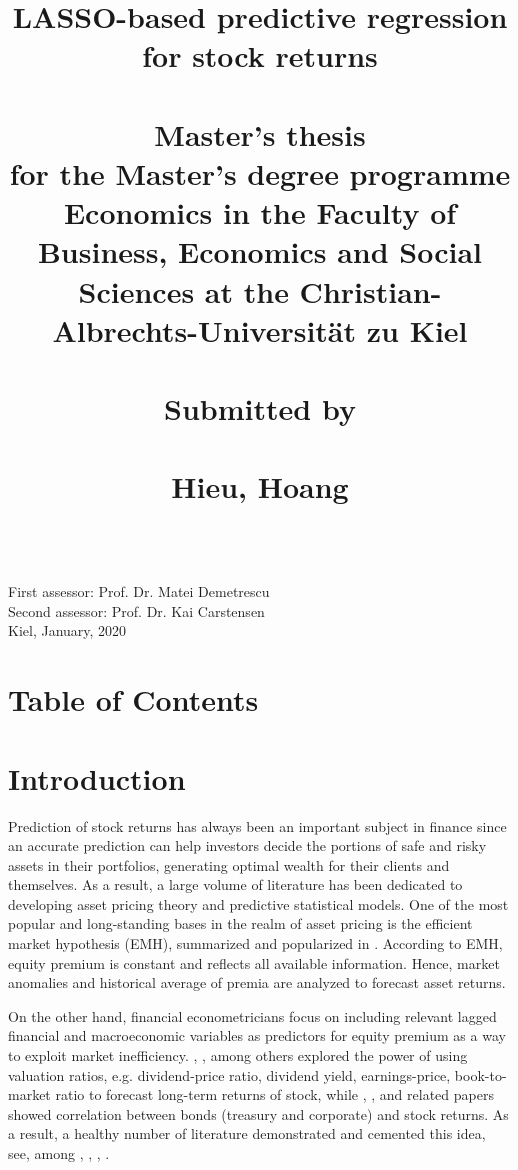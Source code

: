 \documentclass[12pt,a4paper]{article}
\title{LASSO-based predictive regression for stock returns \\~\\
\large Master's thesis \\
\large for the Master's degree programme Economics in the Faculty of Business, Economics and Social Sciences at the Christian-Albrechts-Universität zu Kiel \\~\\
\large Submitted by \\~\\
\large Hieu, Hoang}
\date{}
\begin{document}
\begin{titlepage}
	\maketitle
	\mbox{} \\[1in]
	First assessor: Prof. Dr. Matei Demetrescu \\
	Second assessor: Prof. Dr. Kai Carstensen \\
	Kiel, January, 2020
	
\end{titlepage}

\section*{Table of Contents}
\tableofcontents
\newpage

\section{Introduction}
Prediction of stock returns has always been an important subject in finance since an accurate prediction can help investors decide the portions of safe and risky assets in their portfolios, generating optimal wealth for their clients and themselves. As a result, a large volume of literature has been dedicated to developing asset pricing theory and predictive statistical models. One of the most popular and long-standing bases in the realm of asset pricing is the efficient market hypothesis (EMH), summarized and popularized in \cite{fama1970efficient}. According to EMH, equity premium is constant and reflects all available information. Hence, market anomalies and historical average of premia are analyzed to forecast asset returns.

On the other hand, financial econometricians focus on including relevant lagged financial and macroeconomic variables as predictors for equity premium as a way to exploit market inefficiency. \cite{fama1988dividend}, \cite{schiller1998valuation}, among others explored the power of using valuation ratios, e.g. dividend-price ratio, dividend yield, earnings-price, book-to-market ratio to forecast long-term returns of stock, while \cite{fama1990stock}, \cite{schwert1990stock}, and related papers showed correlation between bonds (treasury and corporate) and stock returns. As a result, a healthy number of literature demonstrated and cemented this idea, see, among \cite{hodrick1992dividend}, \cite{kothari1997book}, \cite{lamont1998earnings}, 
\cite{pontiff1998book}.
\end{document}
